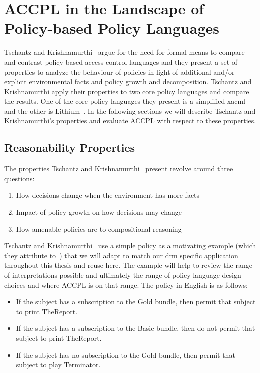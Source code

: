 \chapter{ACCPL in the Landscape of Policy-based Policy Languages}\label{chap:landscapechap}

Tschantz and Krishnamurthi~\cite{Tschantz} argue for the need for formal means to compare and contrast policy-based access-control languages and they present a set of properties to analyze the behaviour of policies in light of additional and/or explicit environmental facts and policy growth and decomposition. Tschantz and Krishnamurthi apply their properties to two core policy languages and compare the results. One of the core policy languages they present is a simplified \ac{xacml} and the other is Lithium~\cite{Halpern2008}. In the following sections we will describe Tschantz and Krishnamurthi's properties and evaluate \ac{ACCPL} with respect to these properties.

\section{Reasonability Properties}\label{sec:threeinterpretations}

The properties Tschantz and Krishnamurthi~\cite{Tschantz} present revolve around three questions:

\begin{enumerate}
\item How decisions change when the environment has more facts
\item Impact of policy growth on how decisions may change
\item How amenable policies are to compositional reasoning
\end{enumerate}

Tschantz and Krishnamurthi~\cite{Tschantz} use a simple policy as a motivating example (which they attribute to~\cite{Halpern2008}) that we will adapt to match our \ac{drm} specific application throughout this thesis and reuse here. The example will help to review the range of interpretations possible and ultimately the range of policy language design choices and where \ac{ACCPL} is on that range.
The policy in English is as follows:

\begin{itemize}
\item If the subject has a subscription to the Gold bundle, then permit that subject to print TheReport.

\item If the subject has a subscription to the Basic bundle, then do not permit that subject to print TheReport.

\item If the subject has no subscription to the Gold bundle, then permit that subject to play Terminator.
\end{itemize}

